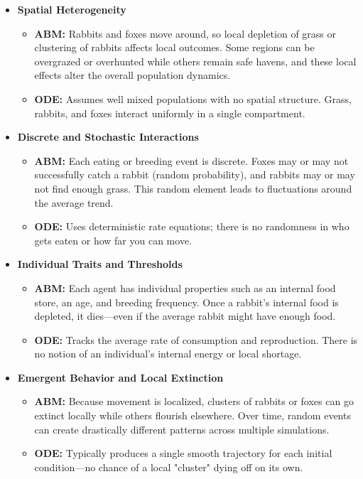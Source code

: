 \begin{itemize}
    \item \textbf{Spatial Heterogeneity}
    \begin{itemize}
        \item \textbf{ABM:} Rabbits and foxes move around, so local depletion of grass or clustering of rabbits affects local outcomes. Some regions can be overgrazed or overhunted while others remain safe havens, and these local effects alter the overall population dynamics.
        \item \textbf{ODE:} Assumes well mixed populations with no spatial structure. Grass, rabbits, and foxes interact uniformly in a single compartment.
    \end{itemize}
    
    \item \textbf{Discrete and Stochastic Interactions}
    \begin{itemize}
        \item \textbf{ABM:} Each eating or breeding event is discrete. Foxes may or may not successfully catch a rabbit (random probability), and rabbits may or may not find enough grass. This random element leads to fluctuations around the average trend.
        \item \textbf{ODE:} Uses deterministic rate equations; there is no randomness in who gets eaten or how far you can move.
    \end{itemize}
    
    \item \textbf{Individual Traits and Thresholds}
    \begin{itemize}
        \item \textbf{ABM:} Each agent has individual properties such as an internal food store, an age, and breeding frequency. Once a rabbit's internal food is depleted, it dies—even if the average rabbit might have enough food.
        \item \textbf{ODE:} Tracks the average rate of consumption and reproduction. There is no notion of an individual's internal energy or local shortage.
    \end{itemize}
    
    \item \textbf{Emergent Behavior and Local Extinction}
    \begin{itemize}
        \item \textbf{ABM:} Because movement is localized, clusters of rabbits or foxes can go extinct locally while others flourish elsewhere. Over time, random events can create drastically different patterns across multiple simulations.
        \item \textbf{ODE:} Typically produces a single smooth trajectory for each initial condition—no chance of a local "cluster" dying off on its own.
    \end{itemize}
    

\end{itemize}
